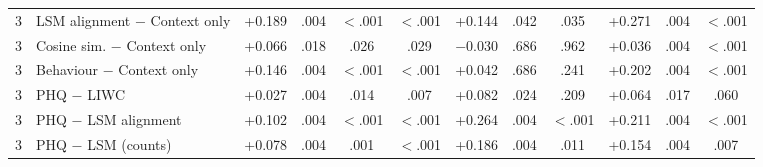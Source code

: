 \begin{tabular}{llrcccrccrcc}
3 & LSM alignment $-$ Context only & +0.189 & .004 & $<$.001 & $<$.001 & +0.144 & .042 & .035 & +0.271 & .004 & $<$.001 \\
3 & Cosine sim. $-$ Context only & +0.066 & .018 & .026 & .029 & $-$0.030 & .686 & .962 & +0.036 & .004 & $<$.001 \\
3 & Behaviour $-$ Context only & +0.146 & .004 & $<$.001 & $<$.001 & +0.042 & .686 & .241 & +0.202 & .004 & $<$.001 \\
3 & PHQ $-$ LIWC & +0.027 & .004 & .014 & .007 & +0.082 & .024 & .209 & +0.064 & .017 & .060 \\
3 & PHQ $-$ LSM alignment & +0.102 & .004 & $<$.001 & $<$.001 & +0.264 & .004 & $<$.001 & +0.211 & .004 & $<$.001 \\
3 & PHQ $-$ LSM (counts) & +0.078 & .004 & .001 & $<$.001 & +0.186 & .004 & .011 & +0.154 & .004 & .007 \\
\bottomrule
\end{tabular}

